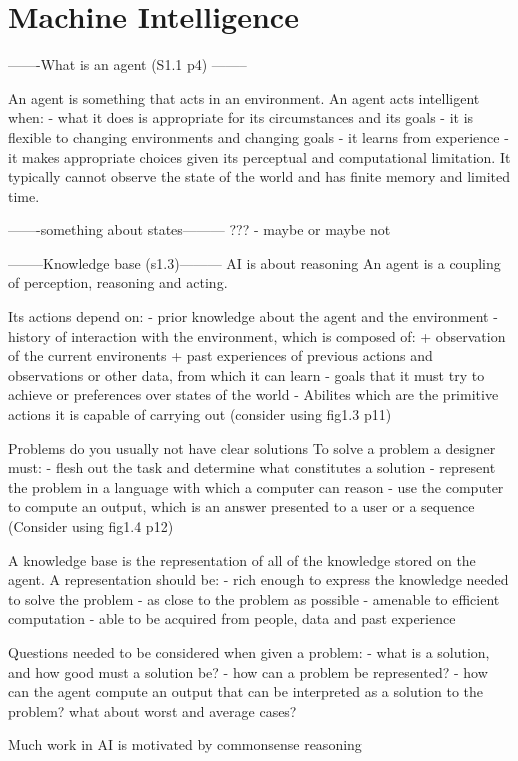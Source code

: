 \section{Machine Intelligence}
 
-------What is an agent (S1.1 p4) --------

An agent is something that acts in an environment.
An agent acts intelligent when:
- what it does is appropriate for its circumstances and its goals
- it is flexible to changing environments and changing goals
- it learns from experience
- it makes appropriate choices given its perceptual and computational
limitation. It typically cannot observe the state of the world and has finite
memory and limited time.

-------something about states---------
??? - maybe or maybe not

--------Knowledge base (s1.3)---------
AI is about reasoning
An agent is a coupling of perception, reasoning and acting.

Its actions depend on:
- prior knowledge about the agent and the environment
- history of interaction with the environment, which is composed of:
+ observation of the current environents
+ past experiences of previous actions and observations or other data, from
which it can learn
- goals that it must try to achieve or preferences over states of the world
- Abilites which are the primitive actions it is capable of carrying out
(consider using fig1.3 p11)

Problems do you usually not have clear solutions
To solve a problem a designer must:
- flesh out the task and determine what constitutes a solution
- represent the problem in a language with which a computer can reason
- use the computer to compute an output, which is an answer presented to a user
or a sequence
(Consider using fig1.4 p12)

A knowledge base is the representation of all of the knowledge stored on the
agent. A representation should be:
- rich enough to express the knowledge needed to solve the problem
- as close to the problem as possible
- amenable to efficient computation
- able to be acquired from people, data and past experience

Questions needed to be considered when given a problem:
- what is a solution, and how good must a solution be?
- how can a problem be represented?
- how can the agent compute an output that can be interpreted as a solution to
the problem? what about worst and average cases?

Much work in AI is motivated by commonsense reasoning

